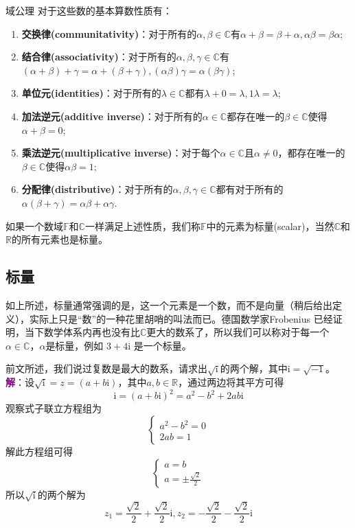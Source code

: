 \begin{axiom}{域公理}
	对于这些数的基本算数性质有：
	\begin{enumerate}
		\item \textbf{交换律(communitativity)}：对于所有的$\alpha,\beta \in \mathbb{C}$有$\alpha+\beta=\beta+\alpha,\alpha\beta=\beta\alpha$;
		\item \textbf{结合律(associativity)}：对于所有的$\alpha,\beta,\gamma \in \mathbb{C}$有$(\alpha+\beta)+\gamma=\alpha+(\beta+\gamma),(\alpha\beta)\gamma=\alpha(\beta\gamma)$;
		\item \textbf{单位元(identities)}：对于所有的$\lambda \in \mathbb{C}$都有$\lambda+0=\lambda,1\lambda=\lambda$;
		\item \textbf{加法逆元(additive inverse)}：对于所有的$\alpha \in \mathbb{C}$都存在唯一的$\beta \in \mathbb{C}$使得$\alpha+\beta=0$;
		\item \textbf{乘法逆元(multiplicative inverse)}：对于每个$\alpha \in\mathbb{C}$且$\alpha\neq 0$，都存在唯一的$\beta \in \mathbb{C}$使得$\alpha\beta=1$;
		\item \textbf{分配律(distributive)}：对于所有的$\alpha,\beta,\gamma \in \mathbb{C}$都有对于所有的$\alpha(\beta+\gamma)=\alpha\beta +\alpha\gamma$.
	\end{enumerate}
\end{axiom}

如果一个数域$\mathbb{F}$和$\mathbb{C}$一样满足上述性质，我们称$\mathbb{F}$中的元素为标量(scalar)，当然$\mathbb{C}$和$\mathbb{R}$的所有元素也是标量。

\subsection{标量}

如上所述，标量通常强调的是，这一个元素是一个数，而不是向量（稍后给出定义），实际上只是``数''的一种花里胡哨的叫法而已。德国数学家Frobenius 已经证明，当下数学体系内再也没有比$\mathbb{C}$更大的数系了，所以我们可以称对于每一个$\alpha \in \mathbb{C}$，$\alpha$是标量，例如 $3+4\mathrm{i}$ 是一个标量。

\begin{example}
	前文所述，我们说过复数是最大的数系，请求出$\sqrt{\mathrm{i}}$的两个解，其中$\mathrm{i}=\sqrt{-1}$。
	\tcblower
	\textcolor{purple}{\textbf{解}}：设$\sqrt{\mathrm{i}}=z=(a+b\mathrm{i})$，其中$a,b \in \mathbb{R}$，通过两边将其平方可得$$\mathrm{i}=(a+b\mathrm{i})^2=a^2-b^2+2ab\mathrm{i}$$观察式子联立方程组为$$\left\{\begin{matrix} 
		a^2-b^2=0 \\  
		2ab=1
	\end{matrix}\right. $$
	解此方程组可得$$\left\{\begin{matrix} 
		a=b \\ 
		a=\pm \frac{\sqrt{2} }{2} 
	\end{matrix}\right. $$
	所以$\sqrt{\mathrm{i}}$的两个解为$$z_1=\frac{\sqrt{2}}{2}+\frac{\sqrt{2}}{2}\mathrm{i},z_2=-\frac{\sqrt{2}}{2}-\frac{\sqrt{2}}{2}\mathrm{i}$$
\end{example}

